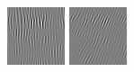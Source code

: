 \begin{figure}
 \begin{center}
  \includegraphics[width=\columnwidth/9]{ch4/figures/imag_-1_0.jpg}
  \includegraphics[width=\columnwidth/9]{ch4/figures/imag_-1_1.jpg}

\end{center}
\end{figure}

